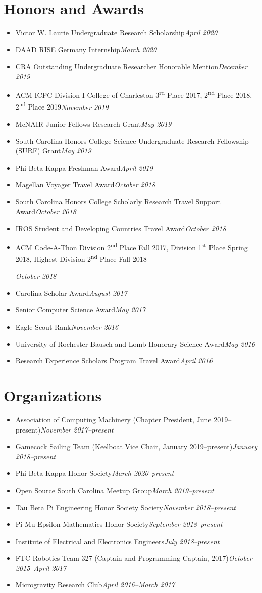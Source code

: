 \documentclass[\ifdefined\cv11pt\else10pt\fi,letterpaper,roman]{moderncv}
\newcommand{\cvonly}[1]{\ifdefined\cv#1\fi}
\renewcommand{\cvitem}[2]{\item {#1}\hfill\textit{#2}}
\newcommand{\st}{\textsuperscript{st}\xspace}
\newcommand{\nd}{\textsuperscript{nd}\xspace}
\newcommand{\rd}{\textsuperscript{rd}\xspace}
\let\oldsection\section
\renewcommand{\section}[1]{\vspace*{-1.3ex}\oldsection{#1}\vspace*{-0.5ex}}
\begin{document}
\section{\textbf{Honors and Awards}}
\begin{itemize}
	\cvitem{Victor W. Laurie Undergraduate Research Scholarship}{April 2020}
	\cvitem{DAAD RISE Germany Internship}{March 2020}  %
	\cvitem{CRA Outstanding Undergraduate Researcher Honorable Mention}{December 2019}
	\cvitem{ACM ICPC Division I College of Charleston 3\rd Place 2017, 2\nd Place 2018, 2\nd Place 2019}{November 2019}
	\cvitem{McNAIR Junior Fellows Research Grant}{May 2019}
	\cvitem{South Carolina Honors College Science Undergraduate Research Fellowship (SURF) Grant}{May 2019}
	\cvitem{Phi Beta Kappa Freshman Award}{April 2019}
	\cvitem{Magellan Voyager Travel Award}{October 2018}
	\cvitem{South Carolina Honors College Scholarly Research Travel Support Award}{October 2018}
	\cvitem{IROS Student and Developing Countries Travel Award}{October 2018}
	\cvitem{\parbox[t]{0.75\linewidth}{ACM Code-A-Thon Division 2\nd Place Fall 2017, Division 1\st Place Spring 2018, Highest Division 2\nd Place Fall 2018}\vspace*{0.6ex}}{October 2018}
	\cvitem{Carolina Scholar Award}{August 2017}
	\cvonly{\cvitem{Senior Computer Science Award}{May 2017}}
	\cvitem{Eagle Scout Rank}{November 2016}
	\cvonly{\cvitem{University of Rochester Bausch and Lomb Honorary Science Award}{May 2016}}
	\cvitem{Research Experience Scholars Program Travel Award}{April 2016}
\end{itemize}

\section{\textbf{Organizations}}
\begin{itemize}
	\cvitem{Association of Computing Machinery (Chapter President, June 2019--present)}{November 2017--present}
	\cvitem{Gamecock Sailing Team (Keelboat Vice Chair, January 2019--present)}{January 2018--present}
	\cvitem{Phi Beta Kappa Honor Society}{March 2020--present}  %
	\cvitem{Open Source South Carolina Meetup Group}{March 2019--present}
	\cvitem{Tau Beta Pi Engineering Honor Society Society}{November 2018--present}
	\cvitem{Pi Mu Epsilon Mathematics Honor Society}{September 2018--present}
	\cvitem{Institute of Electrical and Electronics Engineers}{July 2018--present}
	\cvonly{
		\cvitem{FTC Robotics Team 327 (Captain and Programming Captain, 2017)}{October 2015--April 2017}
		\cvitem{Microgravity Research Club}{April 2016--March 2017}
	}
\end{itemize}
\end{document}
